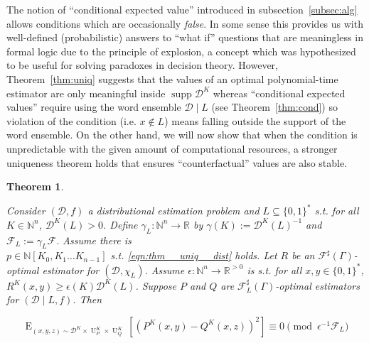 \documentclass{article}
\numberwithin{equation}{section}
\theoremstyle{definition}
\theoremstyle{plain}
\newtheorem{theorem}{Theorem}[section]
\newcommand{\Bool}{\{0,1\}}
\newcommand{\Words}{{\Bool^*}}
\DeclareMathOperator{\Supp}{supp}
\DeclareMathOperator{\E}{E}
\DeclareMathOperator{\Un}{U}
\newcommand{\Nats}{\mathbb{N}}
\newcommand{\Reals}{\mathbb{R}}
\newcommand{\NatPoly}{\Nats[K_0, K_1 \ldots K_{n-1}]}
\newcommand{\NatFun}{\Nats^n \rightarrow}
\newcommand{\Dist}{\mathcal{D}}
\newcommand{\Fall}{\mathcal{F}}
\newcommand{\ESG}{\Fall^\sharp(\Gamma)}
\begin{document}
The notion of \enquote{conditional expected value} introduced in subsection~\ref{subsec:alg} allows conditions which are occasionally \emph{false}. In some sense this provides us with well-defined (probabilistic) answers to \enquote{what if} questions that are meaningless in formal logic due to the principle of explosion, a concept which was hypothesized to be useful for solving paradoxes in decision theory\cite{Soares_2015}. However, Theorem~\ref{thm:uniq} suggests that the values of an optimal polynomial-time estimator are only meaningful inside ${\Supp \Dist^K}$ whereas \enquote{conditional expected values} require using the word ensemble ${\Dist \mid L}$ (see Theorem~\ref{thm:cond}) so violation of the condition (i.e. ${x \not\in L}$) means falling outside the support of the word ensemble. On the other hand, we will now show that when the condition is unpredictable with the given amount of computational resources, a stronger uniqueness theorem holds that ensures \enquote{counterfactual} values are also stable.

\begin{samepage}
\begin{theorem}
\label{thm:uniq_cond}

Consider ${(\Dist,f)}$ a distributional estimation problem and ${L \subseteq \Words}$ s.t. for all ${K \in \Nats^n}$, $\Dist^K(L) > 0$. Define $\gamma_L: \NatFun \Reals$ by $\gamma(K):=\Dist^{K}(L)^{-1}$ and $\Fall_L:=\gamma_L \Fall$. Assume there is\\ ${p \in \NatPoly}$ s.t. \ref{eqn:thm__uniq__dist} holds. Let ${R}$ be an ${\ESG}$-optimal estimator for ${(\Dist, \chi_L)}$. Assume ${\epsilon: \NatFun \Reals^{>0}}$ is s.t. for all ${x,y \in \Words}$, ${R^K(x,y) \geq \epsilon(K) \Dist^K(L)}$. Suppose ${P}$ and ${Q}$ are ${\Fall_L^\sharp(\Gamma)}$-optimal estimators for ${(\Dist \mid L,f)}$. Then

\begin{equation}
\E_{(x,y,z) \sim \Dist^K \times \Un_P^K \times \Un_Q^K}[(P^K(x,y)-Q^K(x,z))^2] \equiv 0 \pmod {\epsilon^{-1} \Fall_L}
\end{equation}

\end{theorem}
\end{samepage}
\end{document}
